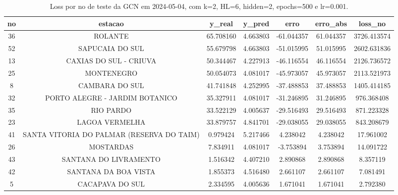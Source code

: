 \begin{table}[h]
\centering
\caption{Loss por no de teste da GCN em 2024-05-04, com k=2, HL=6, hidden=2, epochs=500 e lr=0.001.}
\label{tab:gcn_loss_k2_hl6_h2_e500_d20240504}
\begin{tabular}{ccccccc}
\toprule
no & estacao & y\_real & y\_pred & erro & erro\_abs & loss\_no \\
\midrule
36 & ROLANTE & 65.708160 & 4.663803 & -61.044357 & 61.044357 & 3726.413574 \\
52 & SAPUCAIA DO SUL & 55.679798 & 4.663803 & -51.015995 & 51.015995 & 2602.631836 \\
13 & CAXIAS DO SUL - CRIUVA & 50.344467 & 4.227913 & -46.116554 & 46.116554 & 2126.736572 \\
25 & MONTENEGRO & 50.054073 & 4.081017 & -45.973057 & 45.973057 & 2113.521973 \\
8 & CAMBARA DO SUL & 41.741848 & 4.252995 & -37.488853 & 37.488853 & 1405.414185 \\
32 & PORTO ALEGRE - JARDIM BOTANICO & 35.327911 & 4.081017 & -31.246895 & 31.246895 & 976.368408 \\
35 & RIO PARDO & 33.522129 & 4.005637 & -29.516493 & 29.516493 & 871.223328 \\
23 & LAGOA VERMELHA & 33.879757 & 4.841701 & -29.038055 & 29.038055 & 843.208679 \\
41 & SANTA VITORIA DO PALMAR (RESERVA DO TAIM) & 0.979424 & 5.217466 & 4.238042 & 4.238042 & 17.961002 \\
26 & MOSTARDAS & 7.834911 & 4.081017 & -3.753894 & 3.753894 & 14.091722 \\
43 & SANTANA DO LIVRAMENTO & 1.516342 & 4.407210 & 2.890868 & 2.890868 & 8.357119 \\
42 & SANTANA DA BOA VISTA & 1.855373 & 4.516480 & 2.661107 & 2.661107 & 7.081491 \\
5 & CACAPAVA DO SUL & 2.334595 & 4.005636 & 1.671041 & 1.671041 & 2.792380 \\
\bottomrule
\end{tabular}
\end{table}

